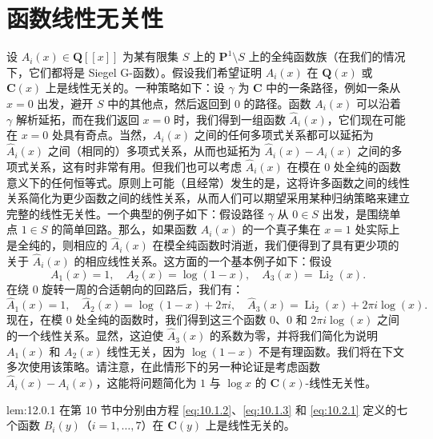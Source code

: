 \section{函数线性无关性}\label{sec:12}

设 $A_i(x) \in \mathbf{Q}[\! [x]\!]$ 为某有限集 $S$ 上的 $\mathbf{P}^1 \setminus S$ 上的全纯函数族（在我们的情况下，它们都将是 Siegel G-函数）。假设我们希望证明 $A_i(x)$ 在 $\mathbf{Q}(x)$ 或 $\mathbf{C}(x)$ 上是线性无关的。一种策略如下：设 $\gamma$ 为 $\mathbf{C}$ 中的一条路径，例如一条从 $x = 0$ 出发，避开 $S$ 中的其他点，然后返回到 $0$ 的路径。函数 $A_i(x)$ 可以沿着 $\gamma$ 解析延拓，而在我们返回 $x = 0$ 时，我们得到一组函数 $\widehat{A}_i(x)$，它们现在可能在 $x = 0$ 处具有奇点。当然，$A_i(x)$ 之间的任何多项式关系都可以延拓为 $\widehat{A}_i(x)$ 之间（相同的）多项式关系，从而也延拓为 $\widehat{A}_i(x) - A_i(x)$ 之间的多项式关系，这有时非常有用。但我们也可以考虑 $\widehat{A}_i(x)$ 在模在 $0$ 处全纯的函数意义下的任何恒等式。原则上可能（且经常）发生的是，这将许多函数之间的线性关系简化为更少函数之间的线性关系，从而人们可以期望采用某种归纳策略来建立完整的线性无关性。一个典型的例子如下：假设路径 $\gamma$ 从 $0 \in S$ 出发，是围绕单点 $1 \in S$ 的简单回路。那么，如果函数 $A_i(x)$ 的一个真子集在 $x = 1$ 处实际上是全纯的，则相应的 $\widehat{A}_i(x)$ 在模全纯函数时消逝，我们便得到了具有更少项的关于 $\widehat{A}_i(x)$ 的相应线性关系。这方面的一个基本例子如下：假设
\[ A_1(x) = 1, \quad A_2(x) = \log(1 - x), \quad A_3(x) = \operatorname{Li}_2(x). \]
在绕 $0$ 旋转一周的合适朝向的回路后，我们有：
\[ \widehat{A}_1(x) = 1, \quad \widehat{A}_2(x) = \log(1 - x) + 2\pi i, \quad \widehat{A}_3(x) = \operatorname{Li}_2(x) + 2\pi i \log(x). \]
现在，在模 $0$ 处全纯的函数时，我们得到这三个函数 $0$、$0$ 和 $2\pi i \log(x)$ 之间的一个线性关系。显然，这迫使 $\widehat{A}_3(x)$ 的系数为零，并将我们简化为说明 $A_1(x)$ 和 $A_2(x)$ 线性无关，因为 $\log(1-x)$ 不是有理函数。我们将在下文多次使用该策略。请注意，在此情形下的另一种论证是考虑函数 $\widehat{A}_i(x) - A_i(x)$，这能将问题简化为 $1$ 与 $\log x$ 的 $\mathbf{C}(x)$-线性无关性。

\begin{mylemma}{}{lem:12.0.1}
在第 10 节中分别由方程 \eqref{eq:10.1.2}、\eqref{eq:10.1.3} 和 \eqref{eq:10.2.1} 定义的七个函数 $B_i(y)$（$i = 1, \dots, 7$）在 $\mathbf{C}(y)$ 上是线性无关的。
\end{mylemma}

